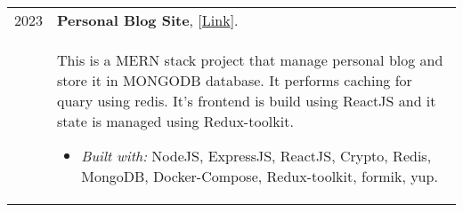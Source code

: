 \documentclass[a4paper,10pt]{article}
\begin{document}
    \begin{longtable}{r p{16cm}}
        2023  & \textbf{Personal Blog Site}, [\href{https://github.com/zaky-fetoh/Personal-Blog-Site}{Link}].\\&
        This is a MERN stack project that manage personal blog and store it in MONGODB database. It performs caching for quary using redis. It's frontend is build using ReactJS and it state is managed using Redux-toolkit.
        \begin{itemize}
            \item \textit{Built with: } NodeJS, ExpressJS,  ReactJS, Crypto, Redis, MongoDB, Docker-Compose, Redux-toolkit, formik, yup.
        \end{itemize}\\
        

\end{longtable}
\end{document}
